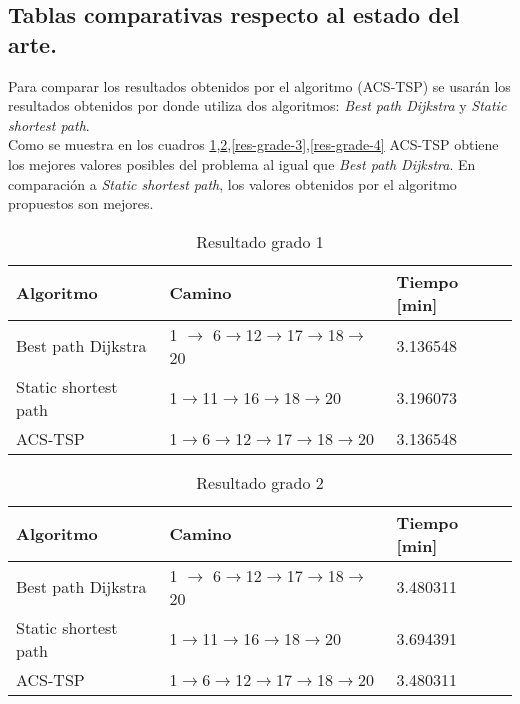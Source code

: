 \subsection{Tablas comparativas respecto al estado del arte.}

Para comparar los resultados obtenidos por el algoritmo (ACS-TSP) se usarán los resultados obtenidos por  \cite{Yuan20091081} donde utiliza dos algoritmos: \textit{Best path Dijkstra} y \textit{Static shortest path}. \\

Como se muestra en los cuadros \ref{res-grade-1},\ref{res-grade-2},\ref{res-grade-3},\ref{res-grade-4} ACS-TSP obtiene los mejores valores posibles del problema al igual que \textit{Best path Dijkstra}. En comparación a \textit{Static shortest path}, los valores obtenidos por el algoritmo propuestos son mejores.
\begin{table}[H]
\centering
\begin{tabular}{|l|l|l|}
\hline
Algoritmo            & Camino           & Tiempo {[}min{]} \\ \hline
Best path Dijkstra   & 1 $\rightarrow$ 6$\rightarrow$12$\rightarrow$17$\rightarrow$18$\rightarrow$20 & 3.136548         \\ \hline
Static shortest path & 1$\rightarrow$11$\rightarrow$16$\rightarrow$18$\rightarrow$20    & 3.196073         \\ \hline
ACS-TSP              & 1$\rightarrow$6$\rightarrow$12$\rightarrow$17$\rightarrow$18$\rightarrow$20 & 3.136548         \\ \hline
\end{tabular}
\caption{Resultado grado 1}
\label{res-grade-1}
\end{table}

\begin{table}[H]
\centering
\begin{tabular}{|l|l|l|}
\hline
Algoritmo            & Camino           & Tiempo {[}min{]} \\ \hline
Best path Dijkstra   & 1 $\rightarrow$ 6$\rightarrow$12$\rightarrow$17$\rightarrow$18$\rightarrow$20 & 3.480311         \\ \hline
Static shortest path & 1$\rightarrow$11$\rightarrow$16$\rightarrow$18$\rightarrow$20    & 3.694391         \\ \hline
ACS-TSP              & 1$\rightarrow$6$\rightarrow$12$\rightarrow$17$\rightarrow$18$\rightarrow$20 & 3.480311         \\ \hline
\end{tabular}
\caption{Resultado grado 2}
\label{res-grade-2}
\end{table}

